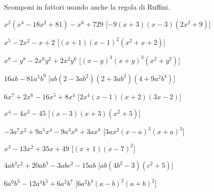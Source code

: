
\begin{esercizio}[\Ast]
 \label{ese:17.24}
 Scomponi in fattori usando anche la regola di Ruffini.
 \begin{enumeratea}
  \item $x^{2}(x^{4}-18x^{2}+81)-x^{6}+729$
  \hfill [$-9(x+3)(x-3)(2x^{2}+9)$]
\item $x^{5}-2x^{2}-x+2$
  \hfill [$(x+1)(x-1)^{2}(x^{2}+x+2)$]
\item $x^{8}-y^{8}-2x^{6}y^{2}+2x^{2}y^{6}$
  \hfill [$(x-y)^{3}(x+y)^{3}(x^{2}+y^{2})$]
\item $16ab-81a^{5}b^{9}$
  \hfill [${ab}(2-3{ab}^{2})(2+3{ab}^{2})(4+9a^{2}b^{4})$]
\item $6x^{7}+2x^{6}-16x^{5}+8x^{4}$
  \hfill [$2x^{4}(x-1)(x+2)(3x-2)$]
\item $x^{4}-4x^{2}-45$
  \hfill [$(x-3)(x+3)(x^{2}+5)$]
\item $-3a^{7}x^{2}+9a^{5}x^{4}-9a^{3}x^{6}+3ax^{8}$
  \hfill [$3ax^{2}(x-a)^{3}(x+a)^{3}$]
\item $x^{3}-13x^{2}+35x+49$
  \hfill [$(x+1)(x-7)^{2}$]
\item $4ab^{3}c^{2}+20ab^{3}-3abc^{2}-15ab$
  \hfill [${ab}(4b^{2}-3)(c^{2}+5)$]
\item $6a^{6}b^{3}-12a^{4}b^{5}+6a^{2}b^{7}$
  \hfill [$6a^{2}b^{3}(a-b)^{2}(a+b)^{2}$]
 \end{enumeratea}
\end{esercizio}

